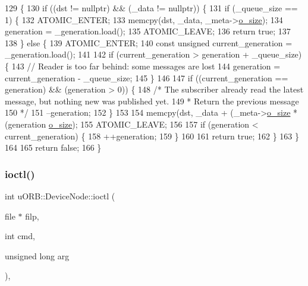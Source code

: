 \begin{DoxyCode}
129 \{
130     \textcolor{keywordflow}{if} ((dst != \textcolor{keyword}{nullptr}) && (\_data != \textcolor{keyword}{nullptr})) \{
131         \textcolor{keywordflow}{if} (\_queue\_size == 1) \{
132             ATOMIC\_ENTER;
133             memcpy(dst, \_data, \_meta->\hyperlink{structorb__metadata_a400a86fe707613e881b620cde7888b74}{o\_size});
134             generation = \_generation.load();
135             ATOMIC\_LEAVE;
136             \textcolor{keywordflow}{return} \textcolor{keyword}{true};
137 
138         \} \textcolor{keywordflow}{else} \{
139             ATOMIC\_ENTER;
140             \textcolor{keyword}{const} \textcolor{keywordtype}{unsigned} current\_generation = \_generation.load();
141 
142             \textcolor{keywordflow}{if} (current\_generation > generation + \_queue\_size) \{
143                 \textcolor{comment}{// Reader is too far behind: some messages are lost}
144                 generation = current\_generation - \_queue\_size;
145             \}
146 
147             \textcolor{keywordflow}{if} ((current\_generation == generation) && (generation > 0)) \{
148                 \textcolor{comment}{/* The subscriber already read the latest message, but nothing new was published yet.}
149 \textcolor{comment}{                * Return the previous message}
150 \textcolor{comment}{                */}
151                 --generation;
152             \}
153 
154             memcpy(dst, \_data + (\_meta->\hyperlink{structorb__metadata_a400a86fe707613e881b620cde7888b74}{o\_size} * (generation %
      \hyperlink{structorb__metadata_a400a86fe707613e881b620cde7888b74}{o\_size});
155             ATOMIC\_LEAVE;
156 
157             \textcolor{keywordflow}{if} (generation < current\_generation) \{
158                 ++generation;
159             \}
160 
161             \textcolor{keywordflow}{return} \textcolor{keyword}{true};
162         \}
163     \}
164 
165     \textcolor{keywordflow}{return} \textcolor{keyword}{false};
166 \}
\end{DoxyCode}
\mbox{\label{classuORB_1_1DeviceNode_acad1520dfb19e9449546dad7a4129c26}} 
\subsubsection{\texorpdfstring{ioctl()}{ioctl()}}
{\footnotesize\ttfamily int u\+O\+R\+B\+::\+Device\+Node\+::ioctl (\begin{DoxyParamCaption}\item[{file $\ast$}]{filp,  }\item[{int}]{cmd,  }\item[{unsigned long}]{arg }\end{DoxyParamCaption})\hspace{0.3cm}{\ttfamily [override]}, {\ttfamily [virtual]}}

